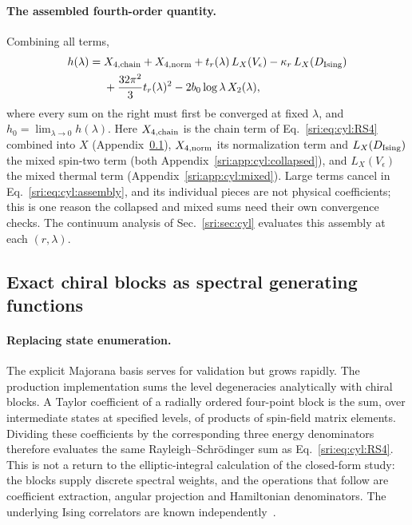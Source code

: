 \paragraph{The assembled fourth-order quantity.} Combining all terms,
\begin{equation}
\begin{aligned}
 h(\lambda)={}&X_{4,\rm chain}+X_{4,\rm norm}+t_r(\lambda)\,L_X(V_\epsilon)-\kappa_r\,L_X(D_{\rm Ising})\\
 &+\frac{32\pi^2}{3}t_r(\lambda)^2-2b_0\log\lambda\,X_2(\lambda),
\end{aligned}
\label{sri:eq:cyl:assembly}
\end{equation}
where every sum on the right must first be converged at fixed $\lambda$, and $h_0=\lim_{\lambda\to0}h(\lambda)$. Here
$X_{4,\rm chain}$ is the chain term of Eq.~\eqref{sri:eq:cyl:RS4} combined into $X$ (Appendix~\ref{sri:app:cyl:blocks}),
$X_{4,\rm norm}$ its normalization term and $L_X(D_{\rm Ising})$ the mixed spin-two term (both
Appendix~\ref{sri:app:cyl:collapsed}), and $L_X(V_\epsilon)$ the mixed thermal term (Appendix~\ref{sri:app:cyl:mixed}). Large terms
cancel in Eq.~\eqref{sri:eq:cyl:assembly}, and its individual pieces are not physical coefficients; this is one reason the
collapsed and mixed sums need their own convergence checks. The continuum analysis of Sec.~\ref{sri:sec:cyl} evaluates
this assembly at each $(r,\lambda)$.

\subsection{Exact chiral blocks as spectral generating functions}\label{sri:app:cyl:blocks}
\paragraph{Replacing state enumeration.} The explicit Majorana basis serves for validation but grows rapidly. The
production implementation sums the level degeneracies analytically with chiral blocks. A Taylor coefficient of a
radially ordered four-point block is the sum, over intermediate states at specified levels, of products of spin-field
matrix elements. Dividing these coefficients by the corresponding three energy denominators therefore evaluates the
same Rayleigh--Schr\"odinger sum as Eq.~\eqref{sri:eq:cyl:RS4}. This is not a return to the elliptic-integral calculation
of the closed-form study: the blocks supply discrete spectral weights, and the operations that follow are coefficient
extraction, angular projection and Hamiltonian denominators. The underlying Ising correlators are known
independently~\cite{sri:Ardonne:2010zz}.

